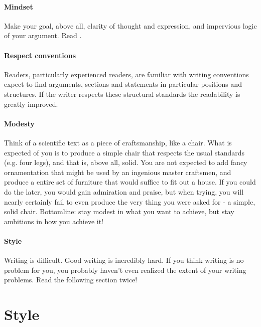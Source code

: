 \documentclass{tufte-book}
\begin{document}
\paragraph{Mindset} Make your goal, above all, clarity of thought and expression, and impervious logic of your argument. Read \citet{Woodford-Sounderthinkingthrough-1967}.

\paragraph{Respect conventions} Readers, particularly experienced readers, are familiar with writing conventions expect to find arguments, sections and statements in particular positions and structures. If the writer respects these structural standards the readability is greatly improved. 


\paragraph{Modesty} Think of a scientific text as a piece of craftsmanship, like a chair. What is expected of you is to produce a simple chair that respects the usual standards (e.g. four legs), and that is, above all, solid. You are not expected to add fancy ornamentation that might be used by an ingenious master craftsmen, and produce a entire set of furniture that would suffice to fit out a house. If you could do the later, you would gain admiration and praise, but when trying, you will nearly certainly fail to even produce the very thing you were asked for - a simple, solid chair. Bottomline: stay modest in what you want to achieve, but stay ambitions in how you achieve it!


\paragraph{Style} Writing is difficult. Good writing is incredibly hard. If you think writing is no problem for you, you probably haven't even realized the extent of your writing problems. Read the following section twice!


\section{Style}
\end{document}
